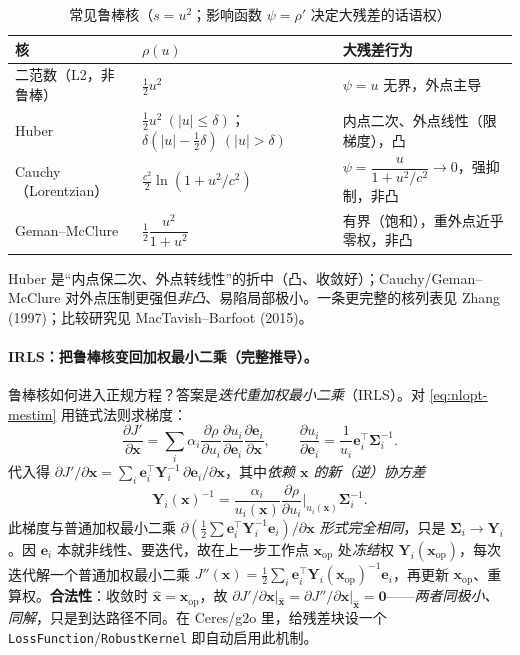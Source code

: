 \begin{table}[H]\centering\small
\caption{常见鲁棒核（$s=u^2$；影响函数 $\psi=\rho'$ 决定大残差的话语权）}
\label{tab:robust}
\begin{tabular}{lll}
\toprule
核 & $\rho(u)$ & 大残差行为 \\
\midrule
二范数（L2，非鲁棒） & $\tfrac12 u^2$ & $\psi=u$ 无界，外点主导 \\
Huber & $\tfrac12u^2\ (|u|\le\delta)$；$\delta(|u|-\tfrac12\delta)\ (|u|>\delta)$ & 内点二次、外点线性（限梯度），凸 \\
Cauchy（Lorentzian） & $\tfrac{c^2}{2}\ln(1+u^2/c^2)$ & $\psi=\dfrac{u}{1+u^2/c^2}\to0$，强抑制，非凸 \\
Geman--McClure & $\tfrac12\dfrac{u^2}{1+u^2}$ & 有界（饱和），重外点近乎零权，非凸 \\
\bottomrule
\end{tabular}
\end{table}

\noindent Huber 是“内点保二次、外点转线性”的折中（凸、收敛好）；Cauchy/Geman--McClure 对外点压制更强但\emph{非凸}、易陷局部极小\cite{barfoot2024state}。一条更完整的核列表见 Zhang (1997)；比较研究见 MacTavish--Barfoot (2015)。

\paragraph{IRLS：把鲁棒核变回加权最小二乘（完整推导）。}\cite{barfoot2024state}
鲁棒核如何进入正规方程？答案是\emph{迭代重加权最小二乘}（IRLS）。对 \cref{eq:nlopt-mestim} 用链式法则求梯度：
\begin{equation}
  \frac{\partial J'}{\partial\mathbf{x}}=\sum_i\alpha_i\frac{\partial\rho}{\partial u_i}\frac{\partial u_i}{\partial\mathbf{e}_i}\frac{\partial\mathbf{e}_i}{\partial\mathbf{x}},
  \qquad \frac{\partial u_i}{\partial\mathbf{e}_i}=\frac{1}{u_i}\mathbf{e}_i^\top\boldsymbol{\Sigma}_i^{-1}.
  \label{eq:nlopt-irls-grad}
\end{equation}
代入得 $\partial J'/\partial\mathbf{x}=\sum_i\mathbf{e}_i^\top\mathbf{Y}_i^{-1}\,\partial\mathbf{e}_i/\partial\mathbf{x}$，其中\emph{依赖 $\mathbf{x}$ 的新（逆）协方差}
\begin{equation}
  \mathbf{Y}_i(\mathbf{x})^{-1}=\frac{\alpha_i}{u_i(\mathbf{x})}\frac{\partial\rho}{\partial u_i}\Big|_{u_i(\mathbf{x})}\boldsymbol{\Sigma}_i^{-1}.
  \label{eq:irls}
\end{equation}
此梯度与普通加权最小二乘 $\partial(\tfrac12\sum\mathbf{e}_i^\top\mathbf{Y}_i^{-1}\mathbf{e}_i)/\partial\mathbf{x}$ \emph{形式完全相同}，只是 $\boldsymbol{\Sigma}_i\to\mathbf{Y}_i$。因 $\mathbf{e}_i$ 本就非线性、要迭代，故在上一步工作点 $\mathbf{x}_{\mathrm{op}}$ 处\emph{冻结}权 $\mathbf{Y}_i(\mathbf{x}_{\mathrm{op}})$，每次迭代解一个普通加权最小二乘 $J''(\mathbf{x})=\tfrac12\sum_i\mathbf{e}_i^\top\mathbf{Y}_i(\mathbf{x}_{\mathrm{op}})^{-1}\mathbf{e}_i$，再更新 $\mathbf{x}_{\mathrm{op}}$、重算权。\textbf{合法性}：收敛时 $\hat{\mathbf{x}}=\mathbf{x}_{\mathrm{op}}$，故 $\partial J'/\partial\mathbf{x}|_{\hat{\mathbf{x}}}=\partial J''/\partial\mathbf{x}|_{\hat{\mathbf{x}}}=\mathbf{0}$——\emph{两者同极小、同解}，只是到达路径不同。在 Ceres/g2o 里，给残差块设一个 \texttt{LossFunction}/\texttt{RobustKernel} 即自动启用此机制。

